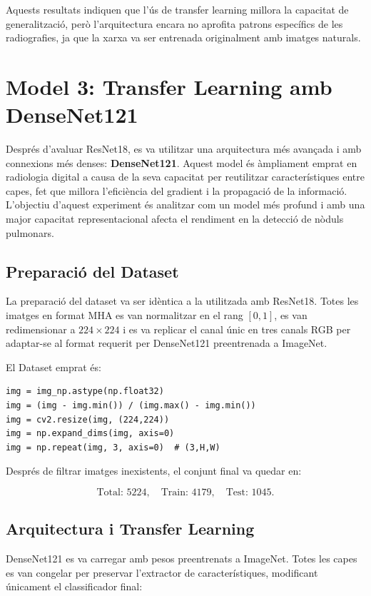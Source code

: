 \documentclass[12pt,a4paper]{article}
\begin{document}
Aquests resultats indiquen que l’ús de transfer learning millora la capacitat de
generalització, però l’arquitectura encara no aprofita patrons específics de les
radiografies, ja que la xarxa va ser entrenada originalment amb imatges naturals.


\section{Model 3: Transfer Learning amb DenseNet121}

Després d’avaluar ResNet18, es va utilitzar una arquitectura més avançada i amb
connexions més denses: \textbf{DenseNet121}. Aquest model és àmpliament emprat en
radiologia digital a causa de la seva capacitat per reutilitzar característiques entre
capes, fet que millora l’eficiència del gradient i la propagació de la informació.
L’objectiu d’aquest experiment és analitzar com un model més profund i amb una major
capacitat representacional afecta el rendiment en la detecció de nòduls pulmonars.

\subsection{Preparació del Dataset}

La preparació del dataset va ser idèntica a la utilitzada amb ResNet18. Totes les imatges
en format MHA es van normalitzar en el rang $[0,1]$, es van redimensionar a $224\times224$
i es va replicar el canal únic en tres canals RGB per adaptar-se al format requerit per
DenseNet121 preentrenada a ImageNet.

El Dataset emprat és:

\begin{lstlisting}[style=mypython]
img = img_np.astype(np.float32)
img = (img - img.min()) / (img.max() - img.min())
img = cv2.resize(img, (224,224))
img = np.expand_dims(img, axis=0)
img = np.repeat(img, 3, axis=0)  # (3,H,W)
\end{lstlisting}

Després de filtrar imatges inexistents, el conjunt final va quedar en:

\[
\text{Total: }5224, \quad
\text{Train: }4179, \quad
\text{Test: }1045.
\]

\subsection{Arquitectura i Transfer Learning}

DenseNet121 es va carregar amb pesos preentrenats a ImageNet. Totes les capes es van
congelar per preservar l’extractor de característiques, modificant únicament el
classificador final:
\end{document}
